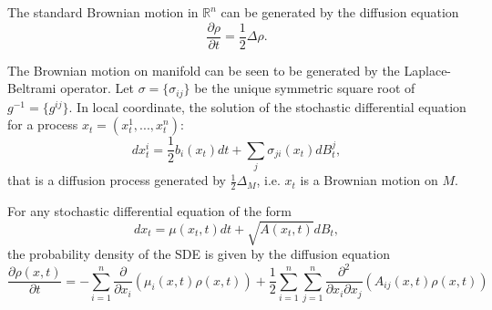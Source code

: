 The standard Brownian motion in $\mathbb{R}^n$ can be generated by the diffusion equation 
\[
\frac{\partial \rho}{\partial t}=\frac{1}{2}\Delta \rho.
\]

The Brownian motion on manifold can be seen to be generated by the Laplace-Beltrami operator. Let $\sigma=\{\sigma_{ij}\}$ be the unique symmetric square root of $g^{-1}=\{g^{ij}\}$. In local coordinate, the solution of the stochastic differential equation for a process $x_t=(x_t^1,...,x_t^n)$:
\[
dx_t^i=\frac{1}{2}b_i(x_t)dt+\sum_j\sigma_{ji}(x_t)dB^j_t,
\]
that is a diffusion process generated by $\frac{1}{2}\Delta_M$, i.e. $x_t$ is a Brownian motion on $M$.

\begin{theorem}
For any stochastic differential equation of the form
\[
dx_t=\mu(x_t,t)dt+\sqrt{A(x_t,t)}dB_t,
\]
the probability density of the SDE is given by the diffusion equation
\[
\frac{\partial\rho(x,t)}{\partial t}=-\sum_{i=1}^n\frac{\partial}{\partial x_i}\left(\mu_i(x,t)\rho(x,t)\right)+\frac{1}{2}\sum_{i=1}^n\sum_{j=1}^n\frac{\partial^2}{\partial x_i\partial x_j}\left(A_{ij}(x,t)\rho(x,t)\right)
\]
\end{theorem}

